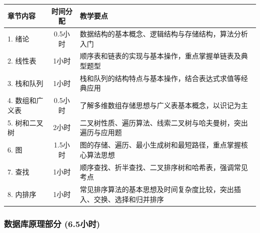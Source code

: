 \documentclass{../note}
\begin{document}
\begin{tabular}{|l|c|p{8cm}|}
	\hline
	\textbf{章节内容} & \textbf{时间分配} & \textbf{教学要点}             \\
	\hline
	1. 绪论         & 0.5小时         &
	数据结构的基本概念、逻辑结构与存储结构，算法分析入门                         \\
	\hline
	2. 线性表        & 1小时           &
	顺序表和链表的实现与基本操作，重点掌握单链表及典型题型                         \\
	\hline
	3. 栈和队列       & 1小时           &
	栈和队列的结构特点与基本操作，结合表达式求值等经典应用                         \\
	\hline
	4. 数组和广义表     & 0.5小时         &
	了解多维数组存储思想与广义表基本概念，以识记为主                             \\
	\hline
	5. 树和二叉树      & 2小时           &
	二叉树性质、遍历算法、线索二叉树与哈夫曼树，突出遍历与应用题                     \\
	\hline
	6. 图          & 1.5小时         &
	图的存储、遍历、最小生成树和最短路径，重点掌握核心算法思想                       \\
	\hline
	7. 查找         & 1小时           &
	顺序查找、折半查找、二叉排序树和哈希表，强调常见考点                           \\
	\hline
	8. 内排序        & 1小时           &
	常见排序算法的基本思想及时间复杂度比较，突出插入、交换、选择和归并排序               \\
	\hline
\end{tabular}

\subsubsection{数据库原理部分 (6.5小时)}
\end{document}
